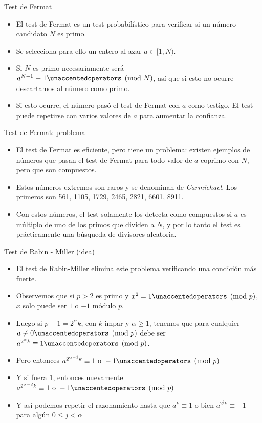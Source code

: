 \documentclass{beamer}
\begin{document}
\begin{frame}{Test de Fermat}
  \begin{itemize}
      \item El test de Fermat es un test probabilístico para verificar si un número candidato $N$ es primo.
      \item Se selecciona para ello un entero al azar $a \in [1, N)$.
      \item Si $N$ es primo necesariamente será $a^{N-1} \equiv 1 \modulo{N}$, así que si esto no ocurre descartamos al número como primo.
      \item Si esto ocurre, el número pasó el test de Fermat con $a$ como testigo. El test puede repetirse con varios valores de $a$ para aumentar la confianza.
  \end{itemize}
\end{frame}

\begin{frame}{Test de Fermat: problema}
  \begin{itemize}
      \item El test de Fermat es eficiente, pero tiene un problema: existen ejemplos de números que pasan el test de Fermat para todo valor de $a$ coprimo con $N$, pero que son compuestos.
      \item Estos números extremos son raros y se denominan de \textit{Carmichael}. Los primeros son 561, 1105, 1729, 2465, 2821, 6601, 8911.
      \item Con estos números, el test solamente los detecta como compuestos si $a$ es múltiplo de uno de los primos que dividen a $N$, y por lo tanto el test es prácticamente una búsqueda de divisores aleatoria.
  \end{itemize}
\end{frame}

\begin{frame}{Test de Rabin - Miller (idea)}
  \begin{itemize}
      \item El test de Rabin-Miller elimina este problema verificando una condición más fuerte.
      \item Observemos que si $p > 2$ es primo y $x^2 = 1 \modulo{p}$, $x$ solo puede ser $1$ o $-1$ módulo $p$.
      \item Luego si $p-1 = 2^\alpha k$, con $k$ impar y $\alpha \geq 1$, tenemos que para cualquier $a \not \equiv 0 \modulo{p}$ debe ser $a^{2^\alpha k} \equiv 1 \modulo{p}$.
      \item Pero entonces $a^{2^{\alpha-1} k} \equiv 1 \mbox{ o } -1 \modulo{p}$
      \item Y si fuera $1$, entonces nuevamente $a^{2^{\alpha-2} k} \equiv 1 \mbox{ o } -1 \modulo{p}$
      \item Y así podemos repetir el razonamiento hasta que $a^{k} \equiv 1$ o bien $a^{2^j k} \equiv -1$ para algún $0 \leq j < \alpha$
  \end{itemize}
\end{frame}
\end{document}
